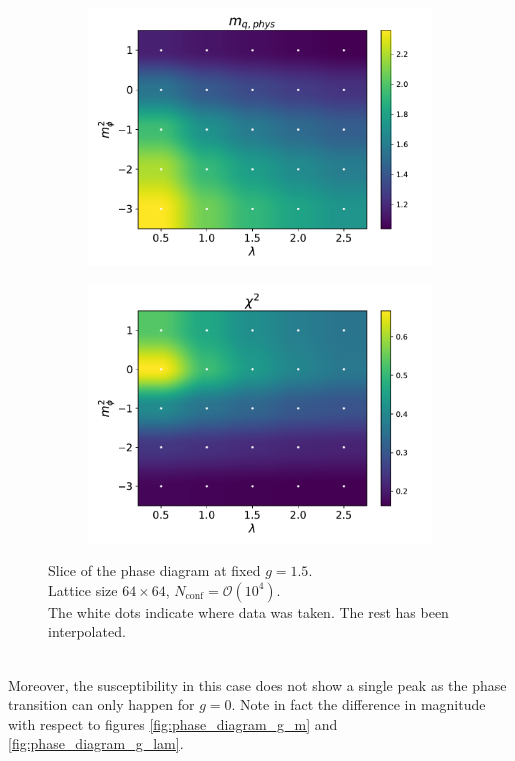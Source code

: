 \begin{figure}[hbp]
\begin{subfigure}[b]{0.47\textwidth}
    \end{subfigure}
    \begin{subfigure}[b]{0.47\textwidth}
        \includegraphics[width=\textwidth]{figures/phase_diagram/m-lam/phase_diagram_mqphys.pdf}
    \end{subfigure}
    \begin{subfigure}[b]{0.47\textwidth}
        \includegraphics[width=\textwidth]{figures/phase_diagram/m-lam/phase_diagram_chi2.pdf}
    \end{subfigure}
    \caption{Slice of the phase diagram at fixed $g = 1.5$. \\ Lattice size $64 \times 64$, $N_\text{conf} = \mathcal{O}(10^4)$. \\ The white dots indicate where data was taken. The rest has been interpolated.}
    \label{fig:phase_diagram_m_lam}
\end{figure}\\
Moreover, the susceptibility in this case does not show a single peak as the phase transition can only happen for $g=0$. Note in fact the difference in magnitude with respect to figures \ref{fig:phase_diagram_g_m} and \ref{fig:phase_diagram_g_lam}.

